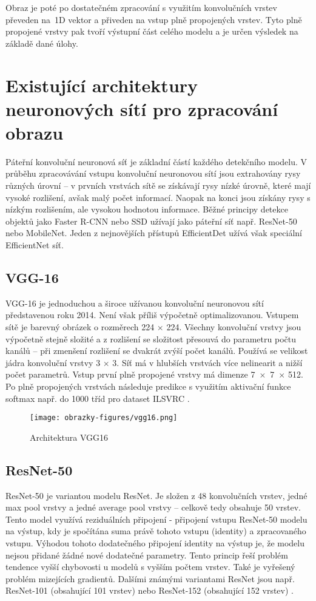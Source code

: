 Obraz je poté po dostatečném zpracování s využitím konvolučních vrstev převeden na~1D vektor a přiveden na vstup plně propojených vrstev. Tyto plně propojené vrstvy pak tvoří výstupní část celého modelu a je určen výsledek na základě dané úlohy.

\section{Existující architektury neuronových sítí pro zpracování obrazu}
Páteřní konvoluční neuronová síť je základní částí každého detekčního modelu. V průběhu zpracovávání vstupu konvoluční neuronovou sítí jsou extrahovány rysy různých úrovní -- v prvních vrstvách sítě se získávají rysy nízké úrovně, které mají vysoké rozlišení, avšak malý počet informací. Naopak na konci jsou získány rysy s nízkým rozlišením, ale vysokou hodnotou informace. Běžné principy detekce objektů jako Faster R-CNN nebo SSD užívají jako páteřní síť např. ResNet-50 nebo MobileNet. Jeden z nejnovějších přístupů EfficientDet užívá však speciální EfficientNet síť.
\subsection*{VGG-16}
VGG-16 je jednoduchou a široce užívanou konvoluční neuronovou sítí představenou roku 2014. Není však příliš výpočetně optimalizovanou. Vstupem sítě je barevný obrázek o rozměrech 224 $\times$ 224. Všechny konvoluční vrstvy jsou výpočetně stejně složité a z rozlišení se složitost přesouvá do parametru počtu kanálů -- při zmenšení rozlišení se dvakrát zvýší počet kanálů. Používá se velikost jádra konvoluční vrstvy 3 $\times$ 3. Síť má v hlubších vrstvách více nelinearit a nižší počet parametrů. Vstup první plně propojené vrstvy má dimenze 7~$\times$~7~$\times$ 512. Po plně propojených vrstvách následuje predikce s využitím aktivační funkce softmax např. do 1000 tříd pro dataset ILSVRC \cite{VGG16}.

\begin{figure}[!htbp]
    \centering
    \texttt{[image: obrazky-figures/vgg16.png]}
    \caption{Architektura VGG16 \cite{VGG16}}
\end{figure}

\subsection*{ResNet-50}
ResNet-50 je variantou modelu ResNet. Je složen z 48 konvolučních vrstev, jedné max pool vrstvy a jedné average pool vrstvy -- celkově tedy obsahuje 50 vrstev. Tento model využívá reziduálních připojení - připojení vstupu ResNet-50 modelu na výstup, kdy je spočítána suma právě tohoto vstupu (identity) a zpracovaného vstupu. Výhodou tohoto dodatečného připojení identity na výstup je, že modelu nejsou přidané žádné nové dodatečné parametry. Tento princip řeší problém tendence vyšší chybovosti u modelů s vyšším počtem vrstev. Také je vyřešený problém mizejících gradientů. Dalšími známými variantami ResNet jsou např. ResNet-101 (obsahující 101 vrstev) nebo ResNet-152 (obsahující 152 vrstev) \cite{ResNet50}.

